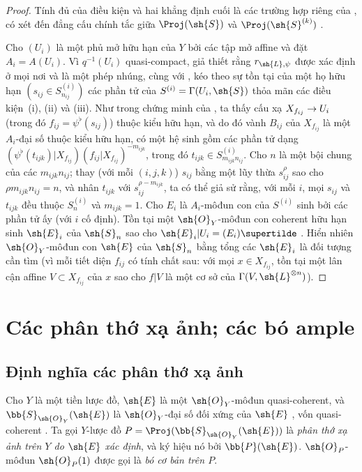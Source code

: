 \documentclass[oneside,10pt]{amsart}
\makeatletter
\newcommand{\ega@arrow}[2]{\mathchoice{#1}{#2}{#2}{#2}}
\renewcommand{\to}{\ega@arrow{\longrightarrow}{\rightarrow}}
\newcommand{\oldpage}[2][]{\marginnote{\normalfont\footnotesize\textbf{#1}~|~#2}\ignorespaces}
\let\EGAOriginalLabel\label
\renewcommand{\label}[1]{\phantomsection\EGAOriginalLabel{#1}}
\makeatother
\begin{document}
\begin{proof}
Tính đủ của điều kiện và hai khẳng định cuối là các trường hợp riêng của , có xét đến đẳng cấu chính tắc giữa $\Proj(\sh{S})$ và $\Proj(\sh{S}^{(k)})$ .

Cho $(U_i)$ là một phủ mở hữu hạn của $Y$ bởi các tập mở affine và đặt $A_i=A(U_i)$.
Vì $q^{-1}(U_i)$ quasi-compact, giả thiết rằng $r_{\sh{L},\psi}$ được xác định ở mọi nơi và là một phép nhúng, cùng với , kéo theo sự tồn tại của một họ hữu hạn $(s_{ij}\in S_{n_{ij}}^{(i)})$ các phần tử của $S^{(i)}=\Gamma(U_i,\sh{S})$ thỏa mãn các điều kiện~(i), (ii) và (iii).
Như trong chứng minh của , ta thấy cấu xạ $X_{f_{ij}}\to U_i$ (trong đó $f_{ij}=\psi^\flat(s_{ij})$) thuộc kiểu hữu hạn, và do đó vành $B_{ij}$ của $X_{f_{ij}}$ là một $A_i$-đại số thuộc kiểu hữu hạn, có một hệ sinh gồm các phần tử dạng $(\psi^\flat(t_{ijk})|X_{f_{ij}})(f_{ij}|X_{f_{ij}})^{-m_{ijk}}$, trong đó $t_{ijk}\in S_{m_{ijk}n_{ij}}^{(i)}$.
Cho $n$ là một bội chung của các $m_{ijk}n_{ij}$;
thay (với mỗi $(i,j,k)$) $s_{ij}$ bằng một lũy thừa $s_{ij}^\rho$ sao cho $\rho m_{ijk}n_{ij}=n$, và nhân $t_{ijk}$ với $s_{ij}^{\rho-m_{ijk}}$, ta có thể giả sử rằng, với mỗi $i$, mọi $s_{ij}$ và $t_{ijk}$ đều thuộc $S_n^{(i)}$ và $m_{ijk}=1$.
Cho $E_i$ là $A_i$-môđun con của $S^{(i)}$ sinh bởi các phần tử ấy (với $i$ cố định).
Tồn tại một $\sh{O}_Y$-môđun con coherent hữu hạn sinh $\sh{E}_i$ của $\sh{S}_n$ sao cho $\sh{E}_i|U_i=(E_i)\supertilde$ .
\oldpage[II]{71}
Hiển nhiên $\sh{O}_Y$-môđun con $\sh{E}$ của $\sh{S}_n$ bằng tổng các $\sh{E}_i$ là đối tượng cần tìm (vì mỗi tiết diện $f_{ij}$ có tính chất sau: với mọi $x\in X_{f_{ij}}$, tồn tại một lân cận affine $V\subset X_{f_{ij}}$ của $x$ sao cho $f|V$ là một cơ sở của $\Gamma(V,\sh{L}^{\otimes n})$).
\end{proof}

\section{Các phân thớ xạ ảnh; các bó ample}
\label{section:II.4}


\subsection{Định nghĩa các phân thớ xạ ảnh}
\label{subsection:II.4.1}

\begin{definition}[4.1.1]
\label{II.4.1.1}
Cho $Y$ là một tiền lược đồ, $\sh{E}$ là một $\sh{O}_Y$-môđun quasi-coherent, và $\bb{S}_{\sh{O}_Y}(\sh{E})$ là $\sh{O}_Y$-đại số đối xứng của $\sh{E}$ , vốn quasi-coherent .
Ta gọi $Y$-lược đồ $P=\Proj(\bb{S}_{\sh{O}_Y}(\sh{E}))$ là \emph{phân thớ xạ ảnh trên $Y$ do $\sh{E}$ xác định}, và ký hiệu nó bởi $\bb{P}(\sh{E})$.
$\sh{O}_P$-môđun $\sh{O}_P(1)$ được gọi là \emph{bó cơ bản trên $P$}.
\end{definition}
\end{document}
